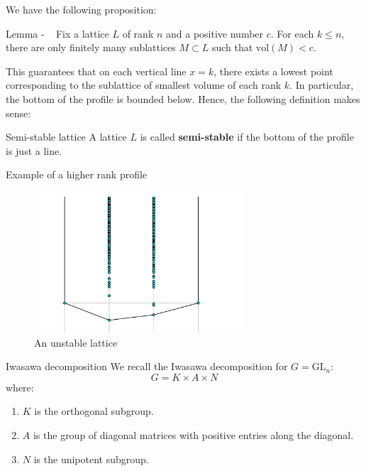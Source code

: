 \documentclass[pdf]{beamer}
\newcommand\Mycite[1]{%
  \citeauthor{#1}~}
\begin{document}
\begin{frame}
    We have the following proposition:
    \begin{block}{Lemma - \Mycite{grayson1984reduction}}
        Fix a lattice $L$ of rank $n$ and a positive number $c$. For each $k \leq n$, there are only finitely many sublattices $M \subset L$ such that
        $\text{vol}(M) < c$.
    \end{block} \pause

    This guarantees that on each vertical line $x = k$, there exists a lowest point corresponding to the sublattice of smallest volume of each rank $k$.
    In particular, the bottom of the profile is bounded below. Hence, the following definition makes sense: \pause
    \begin{block}{Semi-stable lattice}
        A lattice $L$ is called \textbf{semi-stable} if the bottom of the profile is just a line.
    \end{block}
\end{frame}
\begin{frame}{Example of a higher rank profile}
    \centering
    \begin{figure}
        \includegraphics[width = 0.7\textwidth]{Canonical plot 3 dim.png}
        \caption{An unstable lattice}
    \end{figure}
\end{frame}
\begin{frame}{Iwasawa decomposition}
    We recall the Iwasawa decomposition for $G = \text{GL}_n$:
    \[G = K \times A \times N\]
    where:
    \begin{enumerate}
        \item $K$ is the orthogonal subgroup.
        \item $A$ is the group of diagonal matrices with positive entries along the diagonal.
        \item $N$ is the unipotent subgroup.
    \end{enumerate}
\end{frame}
\end{document}
